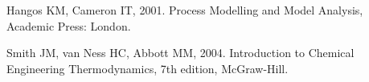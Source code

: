 \documentclass[a4paper,11pt]{article}
\theoremstyle{definition}
\begin{document}
\begin{thebibliography}{2}
\vspace{-0.4cm}
	Hangos KM, Cameron IT, 2001. Process Modelling and Model Analysis, Academic Press: London.

	Smith JM, van Ness HC, Abbott MM, 2004. Introduction to Chemical Engineering Thermodynamics, 7th edition, McGraw-Hill.
\end{thebibliography}
\end{document}
